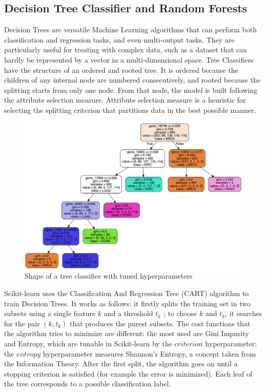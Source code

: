 \documentclass[12pt]{article}
\begin{document}
\subsection{Decision Tree Classifier and Random Forests}

Decision Trees are versatile Machine Learning algorithms that can perform both classification and regression tasks, and even multi-output tasks. They are particularly useful for treating with complex data, such as a dataset that can hardly be represented by a vector in a multi-dimensional space.
Tree Classifiers have the structure of an ordered and rooted tree. It is ordered because the children of any internal node are numbered consecutively, and rooted because the splitting starts from only one node.
From that node, the model is built following the attribute selection measure.
Attribute selection measure is a heuristic for selecting the splitting criterion that partitions data in the best possible manner.


\begin{figure}[h!]
\centering
\includegraphics[width=\linewidth]{img/tree_best.png}
\caption{Shape of a tree classifier with tuned hyperparameters}
\label{fig1}
\end{figure}


Scikit-learn uses the Classification And Regression Tree (CART) algorithm to train Decision Trees. It works as follows: it firstly splits the training set in two subsets using a single feature $k$ and a threshold $t_k$ ; to choose $k$ and $t_k$, it searches for the pair $(k, t_k)$ that produces the purest subsets. The cost functions that the algorithm tries to minimize are different: the most used are Gini Impurity and Entropy, which are tunable in Scikit-learn by the $criterion$ hyperparameter; the $entropy$ hyperparameter measures Shannon's Entropy, a concept taken from the Information Theory. After the first split, the algorithm goes on until a stopping criterion is satisfied (for example the error is minimized). Each leaf of the tree corresponds to a possible classification label.
\end{document}
